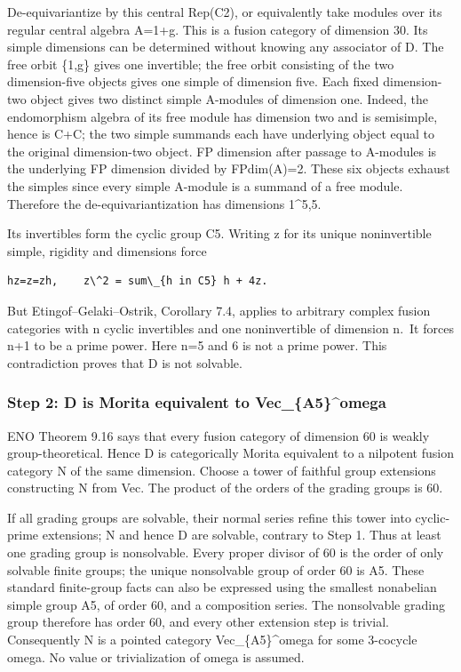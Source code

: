 De-equivariantize by this central Rep(C2), or equivalently take modules
over its regular central algebra A=1+g. This is a fusion category of
dimension 30. Its simple dimensions can be determined without knowing
any associator of D. The free orbit \{1,g\} gives one invertible; the
free orbit consisting of the two dimension-five objects gives one simple
of dimension five. Each fixed dimension-two object gives two distinct
simple A-modules of dimension one. Indeed, the endomorphism algebra of
its free module has dimension two and is semisimple, hence is C+C; the
two simple summands each have underlying object equal to the original
dimension-two object. FP dimension after passage to A-modules is the
underlying FP dimension divided by FPdim(A)=2. These six objects exhaust
the simples since every simple A-module is a summand of a free module.
Therefore the de-equivariantization has dimensions 1\^{}5,5.

Its invertibles form the cyclic group C5. Writing z for its unique
noninvertible simple, rigidity and dimensions force

\begin{verbatim}
hz=z=zh,    z\^2 = sum\_{h in C5} h + 4z.
\end{verbatim}

But Etingof--Gelaki--Ostrik, Corollary 7.4, applies to arbitrary complex
fusion categories with n cyclic invertibles and one noninvertible of
dimension n.~It forces n+1 to be a prime power. Here n=5 and 6 is not a
prime power. This contradiction proves that D is not solvable.

\hypertarget{step-2-d-is-morita-equivalent-to-vec_a5omega}{%
\subsubsection{Step 2: D is Morita equivalent to
Vec\_\{A5\}\^{}omega}\label{step-2-d-is-morita-equivalent-to-vec_a5omega}}

ENO Theorem 9.16 says that every fusion category of dimension 60 is
weakly group-theoretical. Hence D is categorically Morita equivalent to
a nilpotent fusion category N of the same dimension. Choose a tower of
faithful group extensions constructing N from Vec. The product of the
orders of the grading groups is 60.

If all grading groups are solvable, their normal series refine this
tower into cyclic-prime extensions; N and hence D are solvable, contrary
to Step 1. Thus at least one grading group is nonsolvable. Every proper
divisor of 60 is the order of only solvable finite groups; the unique
nonsolvable group of order 60 is A5. These standard finite-group facts
can also be expressed using the smallest nonabelian simple group A5, of
order 60, and a composition series. The nonsolvable grading group
therefore has order 60, and every other extension step is trivial.
Consequently N is a pointed category Vec\_\{A5\}\^{}omega for some
3-cocycle omega. No value or trivialization of omega is assumed.

